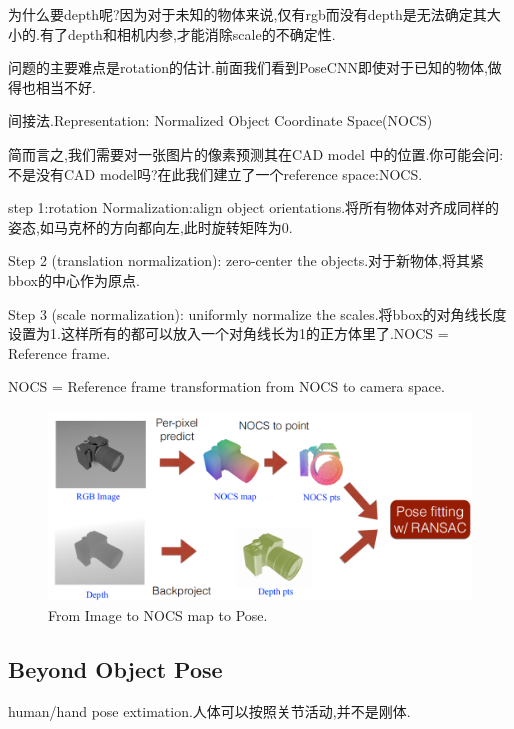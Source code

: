 为什么要depth呢?因为对于未知的物体来说,仅有rgb而没有depth是无法确定其大小的.有了depth和相机内参,才能消除scale的不确定性.

问题的主要难点是rotation的估计.前面我们看到PoseCNN即使对于已知的物体,做得也相当不好.

间接法.Representation: Normalized Object Coordinate Space(NOCS)

简而言之,我们需要对一张图片的像素预测其在CAD model 中的位置.你可能会问:不是没有CAD model吗?在此我们建立了一个reference space:NOCS.

step 1:rotation Normalization:align object orientations.将所有物体对齐成同样的姿态,如马克杯的方向都向左,此时旋转矩阵为0.

Step 2 (translation normalization): zero-center the objects.对于新物体,将其紧bbox的中心作为原点.

Step 3 (scale normalization): uniformly normalize the scales.将bbox的对角线长度设置为1.这样所有的都可以放入一个对角线长为1的正方体里了.NOCS = Reference frame.

NOCS = Reference frame transformation from NOCS to camera space.

\begin{figure}[htbp]
   \centering
   \includegraphics[scale=0.65]{figures/image_nocs_pose.png}
   \caption{From Image to NOCS map to Pose.}
   \label{}
\end{figure}

\subsection{Beyond Object Pose}
human/hand pose extimation.人体可以按照关节活动,并不是刚体.
